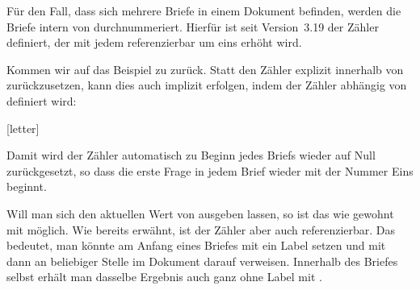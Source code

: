 \begin{Declaration}
\end{Declaration}
Für den Fall, dass
sich mehrere Briefe in einem Dokument befinden, werden die Briefe intern von
\KOMAScript{} durchnummeriert. Hierfür ist seit Version~3.19 der Zähler
 definiert, der mit jedem 
referenzierbar um eins erhöht wird.
\begin{Example}
  Kommen wir auf das Beispiel zu 
  zurück. Statt den Zähler explizit innerhalb von
   zurückzusetzen, kann dies auch implizit
  erfolgen, indem der Zähler  abhängig von 
  definiert wird:
\iffalse %
\begin{lstcode}
  \newcounter{Frage}[letter]
  \newcommand{\Frage}[1]{%
    \par
    \refstepcounter{Frage}%
    \noindent
    \begin{tabularx}{\textwidth}{l@{}X}
      \theFrage:~ & #1\\
    \end{tabularx}%
  }%
\end{lstcode}
\else %
\begin{lstcode}
  [letter]
  \newcommand{\Frage}[1]{%
    \refstepcounter{Frage}\par
    \noindent\begin{tabularx}{\textwidth}{l@{}X}
      \theFrage:~ & #1\\
    \end{tabularx}%
  }%
\end{lstcode}
\fi %
  Damit wird der Zähler automatisch zu Beginn jedes Briefs wieder auf Null
  zurückgesetzt, so dass die erste Frage in jedem Brief wieder mit der Nummer
  Eins beginnt.
\end{Example}

Will man sich den aktuellen Wert von  ausgeben lassen, so ist
das wie gewohnt mit  möglich. Wie bereits erwähnt, ist der
Zähler aber auch referenzierbar. Das bedeutet, man könnte am Anfang eines
Briefes mit  ein Label
setzen und mit  dann an beliebiger Stelle im
Dokument darauf verweisen. Innerhalb des Briefes selbst erhält man dasselbe
Ergebnis auch ganz ohne Label mit .

